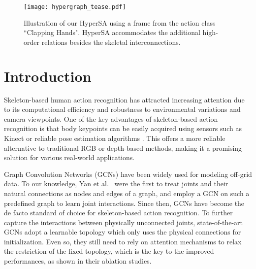 \documentclass[10pt,twocolumn,letterpaper]{article}
\begin{document}
\begin{figure}[]
  \centering
\centering
      \texttt{[image: hypergraph\_tease.pdf]}
     \caption{Illustration of our HyperSA using a frame from the action class ``Clapping Hands".
     HyperSA accommodates the additional high-order relations besides the skeletal interconnections.}
     \label{fig:tease}
\end{figure}



\section{Introduction}
\label{sec:intro}
Skeleton-based human action recognition has attracted increasing attention due to its computational efficiency and robustness to environmental variations and camera viewpoints.
One of the key advantages of skeleton-based action recognition is that body keypoints can be easily acquired using sensors such as Kinect \cite{zhang2012microsoft}  or reliable pose estimation algorithms \cite{cao2017realtime}. 
This offers a more reliable alternative to traditional RGB or depth-based methods, making it a promising solution for various real-world applications.

Graph Convolution Networks (GCNs) have been widely used for modeling off-grid data.
To our knowledge, Yan et al.~\cite{yan2018spatial} were the first to treat joints and their natural connections as nodes and edges of a graph, and employ a GCN \cite{kipf2016semi} on such a predefined graph to learn joint interactions.
Since then, GCNs have become the de facto standard of choice for skeleton-based action recognition.
To further capture the interactions between physically unconnected joints, state-of-the-art GCNs \cite{chi2022infogcn, chen2021channel, ye2020dynamic, shi2019two, song2021constructing, song2020stronger} adopt a learnable topology which only uses the physical connections for initialization.
Even so, they still need to rely on attention mechanisms to relax the restriction of the fixed topology, which is the key to the improved performances, as shown in their ablation studies.
\end{document}
